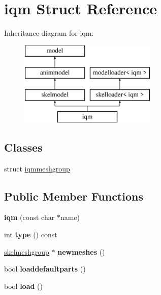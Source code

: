 \hypertarget{structiqm}{}\section{iqm Struct Reference}
\label{structiqm}
Inheritance diagram for iqm\+:\begin{figure}[H]
\begin{center}
\leavevmode
\includegraphics[height=4.000000cm]{structiqm}
\end{center}
\end{figure}
\subsection*{Classes}
\begin{DoxyCompactItemize}
\item 
struct \hyperlink{structiqm_1_1iqmmeshgroup}{iqmmeshgroup}
\end{DoxyCompactItemize}
\subsection*{Public Member Functions}
\begin{DoxyCompactItemize}
\item 
\mbox{\label{structiqm_ad106f5c28729aac77fb4385ae9286aed}} 
{\bfseries iqm} (const char $\ast$name)
\item 
\mbox{\label{structiqm_a0af22a351f71db05eb1332fc8a1a289b}} 
int {\bfseries type} () const
\item 
\mbox{\label{structiqm_a82284705ba2b071faac89e5386311e73}} 
\hyperlink{structskelmodel_1_1skelmeshgroup}{skelmeshgroup} $\ast$ {\bfseries newmeshes} ()
\item 
\mbox{\label{structiqm_a5d2d97b6223843f1fb93f37134d4a09d}} 
bool {\bfseries loaddefaultparts} ()
\item 
\mbox{\label{structiqm_a58553cd14454731b6733351d2d83c738}} 
bool {\bfseries load} ()
\end{DoxyCompactItemize}
